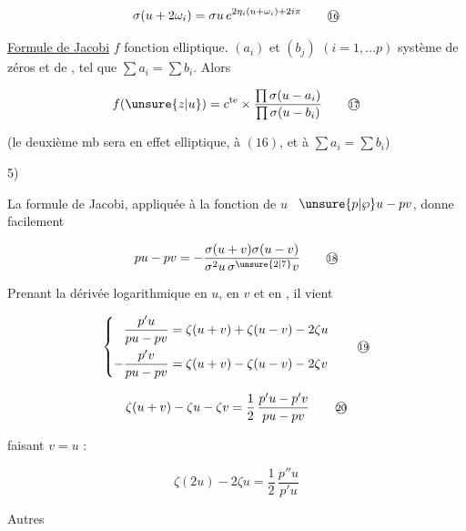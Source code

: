 \[
\sigma(u+2\omega_i)=\sigma u\,e^{2\eta_i(u+\omega_i)+2i\pi}
\tag*{\textcircled{\scriptsize 16}}
\]

\uline{Formule de Jacobi} \quad $f$ fonction elliptique. $(a_i)$ et $(b_j)$ $(i=1,\ldots p)$ système  de zéros et de , tel que $\sum a_i=\sum b_i$. Alors

\[
f(\unsure{z|u})=c^{\mathrm{te}}\times
\frac{\prod\sigma(u-a_i)}{\prod\sigma(u-b_i)}
\tag*{\textcircled{\scriptsize 17}}
\]

(le deuxième mb sera en effet elliptique,  à $(16)$, et à $\sum a_i=\sum b_i$)

5) 

La formule de Jacobi, appliquée à la fonction de $u$ \ $\unsure{p|\wp}u-pv$, donne facilement

\[
pu-pv=-\frac{\sigma(u+v)\sigma(u-v)}{\sigma^2u\,\sigma^{\unsure{2|7}}v}
\tag*{\textcircled{\scriptsize 18}}
\]

Prenant la dérivée logarithmique en $u$, en $v$ et en , il vient

\[
\left\{\begin{aligned}
\frac{p'u}{pu-pv}&=\zeta(u+v)+\zeta(u-v)-2\zeta u\\
-\frac{p'v}{pu-pv}&=\zeta(u+v)-\zeta(u-v)-2\zeta v
\end{aligned}\right.
\tag*{\textcircled{\scriptsize 19}}
\]

\[
\zeta(u+v)-\zeta u-\zeta v=\frac12\,\frac{p'u-p'v}{pu-pv}
\tag*{\textcircled{\scriptsize 20}}
\]

faisant $v=u$ :

\[
\zeta(2u)-2\zeta u=\frac12\,\frac{p''u}{p'u}
\tag*{(20 bis)}
\]

Autres 

